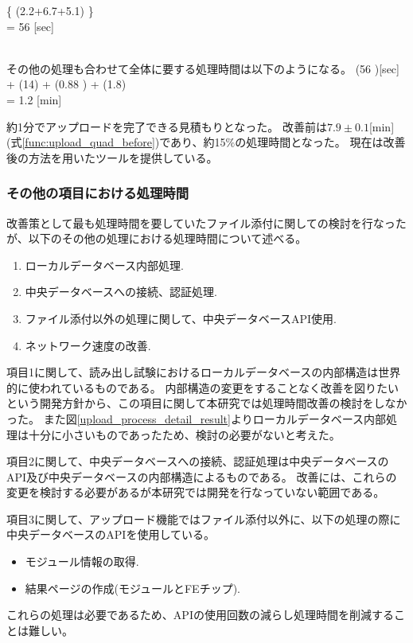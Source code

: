 \bbb
\left\{ (2.2+6.7+5.1) \pm {} \right\}  \nonumber \\
= 56   [{\rm sec}] \\\nonumber\\
\eee

その他の処理も合わせて全体に要する処理時間は以下のようになる。
\bbb
(56  )[\rm{sec}] + (14) + (0.88 ) + (1.8) \nonumber \\
= 1.2  [{\rm min}]
\eee

約1分でアップロードを完了できる見積もりとなった。
改善前は$7.9\pm 0.1$[min](式\ref{func:upload_quad_before})であり、約15$\%$の処理時間となった。
現在は改善後の方法を用いたツールを提供している。

\subsubsection{その他の項目における処理時間}
改善策として最も処理時間を要していたファイル添付に関しての検討を行なったが、以下のその他の処理における処理時間について述べる。

\begin{enumerate}
  \item ローカルデータベース内部処理.
  \item 中央データベースへの接続、認証処理.
  \item ファイル添付以外の処理に関して、中央データベースAPI使用.
  \item ネットワーク速度の改善.
\end{enumerate}

項目1に関して、読み出し試験におけるローカルデータベースの内部構造は世界的に使われているものである。
内部構造の変更をすることなく改善を図りたいという開発方針から、この項目に関して本研究では処理時間改善の検討をしなかった。
また図\ref{upload_process_detail_result}よりローカルデータベース内部処理は十分に小さいものであったため、検討の必要がないと考えた。

項目2に関して、中央データベースへの接続、認証処理は中央データベースのAPI及び中央データベースの内部構造によるものである。
改善には、これらの変更を検討する必要があるが本研究では開発を行なっていない範囲である。

項目3に関して、アップロード機能ではファイル添付以外に、以下の処理の際に中央データベースのAPIを使用している。
\begin{itemize}
  \item モジュール情報の取得.
  \item 結果ページの作成(モジュールとFEチップ).
\end{itemize}
これらの処理は必要であるため、APIの使用回数の減らし処理時間を削減することは難しい。


